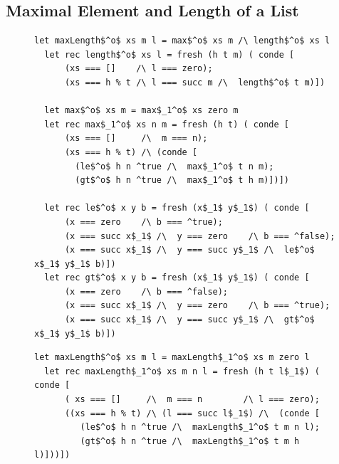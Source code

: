 \subsection{Maximal Element and Length of a List}

\begin{figure}[!t]
  \centering
  \begin{minipage}{0.85\textwidth}
\begin{lstlisting}[label={cpd:maxandlength}, caption={Maximum element and length of the list}, captionpos=b, frame=tb]
  let maxLength$^o$ xs m l = max$^o$ xs m /\ length$^o$ xs l
  let rec length$^o$ xs l = fresh (h t m) ( conde [
      (xs === []    /\ l === zero);
      (xs === h % t /\ l === succ m /\  length$^o$ t m)])

  let max$^o$ xs m = max$_1^o$ xs zero m
  let rec max$_1^o$ xs n m = fresh (h t) ( conde [
      (xs === []     /\  m === n);
      (xs === h % t) /\ (conde [
        (le$^o$ h n ^true /\  max$_1^o$ t n m);
        (gt$^o$ h n ^true /\  max$_1^o$ t h m)])])

  let rec le$^o$ x y b = fresh (x$_1$ y$_1$) ( conde [
      (x === zero    /\ b === ^true);
      (x === succ x$_1$ /\  y === zero    /\ b === ^false);
      (x === succ x$_1$ /\  y === succ y$_1$ /\  le$^o$ x$_1$ y$_1$ b)])
  let rec gt$^o$ x y b = fresh (x$_1$ y$_1$) ( conde [
      (x === zero    /\ b === ^false);
      (x === succ x$_1$ /\  y === zero    /\ b === ^true);
      (x === succ x$_1$ /\  y === succ y$_1$ /\  gt$^o$ x$_1$ y$_1$ b)])
  \end{lstlisting}
\end{minipage}
  \begin{minipage}{0.8\textwidth}
\begin{lstlisting}[label={ideal:maxandlength},  caption={Ideal implementation of maxlengtho}, captionpos=b, frame=tb]
  let maxLength$^o$ xs m l = maxLength$_1^o$ xs m zero l
  let rec maxLength$_1^o$ xs m n l = fresh (h t l$_1$) ( conde [
      ( xs === []     /\  m === n        /\ l === zero);
      ((xs === h % t) /\ (l === succ l$_1$) /\  (conde [
         (le$^o$ h n ^true /\  maxLength$_1^o$ t m n l);
         (gt$^o$ h n ^true /\  maxLength$_1^o$ t m h l)]))])
  \end{lstlisting}
\end{minipage}
\end{figure}

